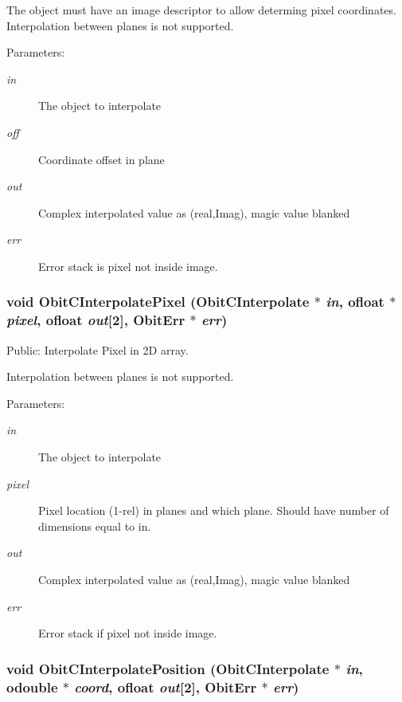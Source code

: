 The object must have an image descriptor to allow determing pixel coordinates. Interpolation between planes is not supported. \begin{Desc}
\item[Parameters:]
\begin{description}
\item[{\em in}]The object to interpolate \item[{\em off}]Coordinate offset in plane \item[{\em out}]Complex interpolated value as (real,Imag), magic value blanked \item[{\em err}]Error stack is pixel not inside image. \end{description}
\end{Desc}
\subsubsection{\setlength{\rightskip}{0pt plus 5cm}void Obit\-CInterpolate\-Pixel ({\bf Obit\-CInterpolate} $\ast$ {\em in}, {\bf ofloat} $\ast$ {\em pixel}, {\bf ofloat} {\em out}[2], {\bf Obit\-Err} $\ast$ {\em err})}\label{ObitCInterpolate_8h_a10}


Public: Interpolate Pixel in 2D array. 

Interpolation between planes is not supported. \begin{Desc}
\item[Parameters:]
\begin{description}
\item[{\em in}]The object to interpolate \item[{\em pixel}]Pixel location (1-rel) in planes and which plane. Should have number of dimensions equal to in. \item[{\em out}]Complex interpolated value as (real,Imag), magic value blanked \item[{\em err}]Error stack if pixel not inside image. \end{description}
\end{Desc}
\subsubsection{\setlength{\rightskip}{0pt plus 5cm}void Obit\-CInterpolate\-Position ({\bf Obit\-CInterpolate} $\ast$ {\em in}, {\bf odouble} $\ast$ {\em coord}, {\bf ofloat} {\em out}[2], {\bf Obit\-Err} $\ast$ {\em err})}\label{ObitCInterpolate_8h_a12}


